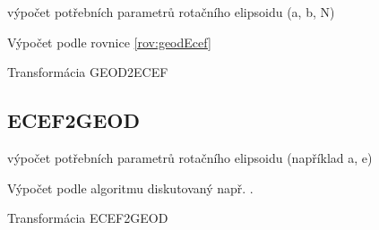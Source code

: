 \documentclass[11pt,a4paper]{article}
\begin{document}
\begin{appendices}
\begin{algorithm}[H]
 výpočet potřebních parametrů rotačního elipsoidu (a, b, N)
 
 Výpočet podle rovnice \ref{rov:geodEcef}
 \caption{Transformácia GEOD2ECEF}
\end{algorithm} 

\subsection{ECEF2GEOD} \label{appEcef2Geod}

\begin{algorithm}[H]
 výpočet potřebních parametrů rotačního elipsoidu (například a, e)
 
 Výpočet podle algoritmu diskutovaný např. \cite{Vermeille2011}.
 \caption{Transformácia ECEF2GEOD}
\end{algorithm} 

\end{appendices}
\end{document}
